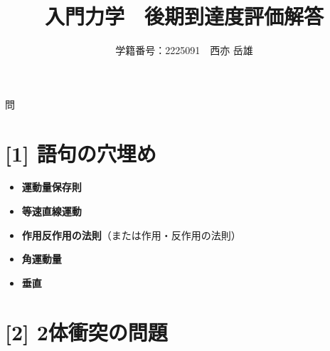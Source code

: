 \documentclass[a4paper,12pt]{jlreq}
\title{入門力学　後期到達度評価解答}
\author{学籍番号：2225091　西亦 岳雄}
\begin{document}
\maketitle



\begin{itembox}[l]{問}

\end{itembox}

\par





\section*{[1] 語句の穴埋め}

\begin{itemize}
    \item[\textbf{[ア]}] \textbf{運動量保存則}
    \item[\textbf{[イ]}] \textbf{等速直線運動}
    \item[\textbf{[ウ]}] \textbf{作用反作用の法則}（または作用・反作用の法則）
    \item[\textbf{[エ]}] \textbf{角運動量}
    \item[\textbf{[オ]}] \textbf{垂直}
\end{itemize}

\section*{[2] 2体衝突の問題}
\end{document}
